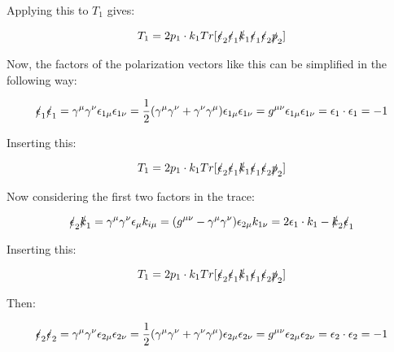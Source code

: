 \documentclass[a4]{article}
\begin{document}
    Applying this to $T_1$ gives:

    \begin{equation}
        T_1 = 2 p_1 \cdot k_1 Tr[\slashed{\epsilon}_2 \slashed{\epsilon}_1 \slashed{k}_1 \slashed{\epsilon}_1 \slashed{\epsilon}_2 \slashed{p}_2]
    \end{equation}

    Now, the factors of the polarization vectors like this can be simplified in the following way:

    \begin{equation}
        \slashed{\epsilon}_1 \slashed{\epsilon}_1 = \gamma^\mu \gamma^\nu \epsilon_{1 \mu} \epsilon_{1 \nu} = \frac{1}{2} (\gamma^\mu \gamma^\nu + \gamma^\nu \gamma^\mu) \epsilon_{1 \mu} \epsilon_{1 \nu} = g^{\mu \nu} \epsilon_{1 \mu} \epsilon_{1 \nu} = \epsilon_1 \cdot \epsilon_1 = - 1
    \end{equation}

    Inserting this:

    \begin{equation}
        T_1 = 2 p_1 \cdot k_1 Tr[\slashed{\epsilon}_2 \slashed{\epsilon}_1 \slashed{k}_1 \slashed{\epsilon}_1 \slashed{\epsilon}_2 \slashed{p}_2]
    \end{equation}

    Now considering the first two factors in the trace:

    \begin{equation}
        \slashed{\epsilon}_2 \slashed{k}_1 = \gamma^\mu \gamma^\nu \epsilon_\mu k_{i \mu} = (g^{\mu \nu} - \gamma^\mu \gamma^\nu) \epsilon_{2 \mu} k_{1 \nu} = 2 \epsilon_1 \cdot k_1 - \slashed{k}_2 \slashed{\epsilon}_1
    \end{equation}

    Inserting this:

    \begin{equation}
        T_1 = 2 p_1 \cdot k_1 Tr[\slashed{\epsilon}_2 \slashed{\epsilon}_1 \slashed{k}_1 \slashed{\epsilon}_1 \slashed{\epsilon}_2 \slashed{p}_2]
    \end{equation}

    Then:

    \begin{equation}
        \slashed{\epsilon}_2 \slashed{\epsilon}_2 = \gamma^\mu \gamma^\nu \epsilon_{2 \mu} \epsilon_{2 \nu} = \frac{1}{2} (\gamma^\mu \gamma^\nu + \gamma^\nu \gamma^\mu) \epsilon_{2 \mu} \epsilon_{2 \nu} = g^{\mu \nu} \epsilon_{2 \mu} \epsilon_{2 \nu} = \epsilon_2 \cdot \epsilon_2 = - 1
    \end{equation}
\end{document}
